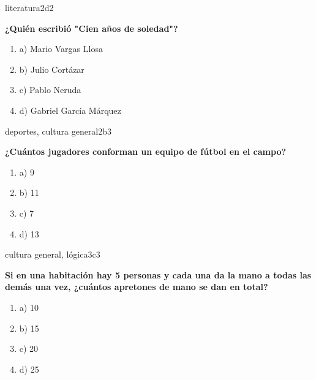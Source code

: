 \documentclass{article}
\begin{document}
\begin{question}{4}{literatura}{2}{d}{2}{
\textbf{¿Quién escribió "Cien años de soledad"?}\\

\begin{enumerate}
    \item a) Mario Vargas Llosa
    \item b) Julio Cortázar
    \item c) Pablo Neruda
    \item d) Gabriel García Márquez
\end{enumerate}
}
\end{question}

\begin{question}{5}{deportes, cultura general}{2}{b}{3}{
\textbf{¿Cuántos jugadores conforman un equipo de fútbol en el campo?}\\

\begin{enumerate}
    \item a) 9
    \item b) 11
    \item c) 7
    \item d) 13
\end{enumerate}
}
\end{question}

\begin{question}{6}{cultura general, lógica}{3}{c}{3}{
\textbf{Si en una habitación hay 5 personas y cada una da la mano a todas las demás una vez, ¿cuántos apretones de mano se dan en total?}\\

\begin{enumerate}
    \item a) 10
    \item b) 15
    \item c) 20
    \item d) 25
\end{enumerate}
}
\end{question}
\end{document}
